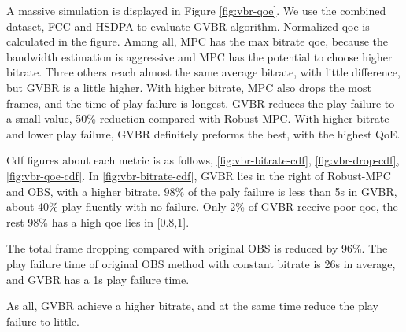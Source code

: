 A massive simulation is displayed in Figure \ref{fig:vbr-qoe}. We use the combined dataset, FCC and HSDPA to evaluate GVBR algorithm. Normalized qoe is calculated in the figure. Among all, MPC has the max bitrate qoe, because the bandwidth estimation is aggressive and MPC has the potential to choose higher bitrate. Three others reach almost the same average bitrate, with little difference, but GVBR is a little higher. With higher bitrate, MPC also drops the most frames, and the time of play failure is longest. GVBR reduces the play failure to a small value, 50\% reduction compared with Robust-MPC. With higher bitrate and lower play failure, GVBR definitely preforms the best, with the highest QoE.

Cdf figures about each metric is as follows, \ref{fig:vbr-bitrate-cdf}, \ref{fig:vbr-drop-cdf}, \ref{fig:vbr-qoe-cdf}. In \ref{fig:vbr-bitrate-cdf}, GVBR lies in the right of Robust-MPC and OBS, with a higher bitrate. $98\%$ of the paly failure is less than 5s in GVBR, about 40\% play fluently with no failure. Only 2\% of GVBR receive poor qoe, the rest 98\% has a high qoe lies in [0.8,1].

The total frame dropping compared with original OBS is reduced by 96\%. The play failure time of original OBS method with constant bitrate is 26s in average, and GVBR has a 1s play failure time.

As all, GVBR achieve a higher bitrate, and at the same time reduce the play failure to little.

